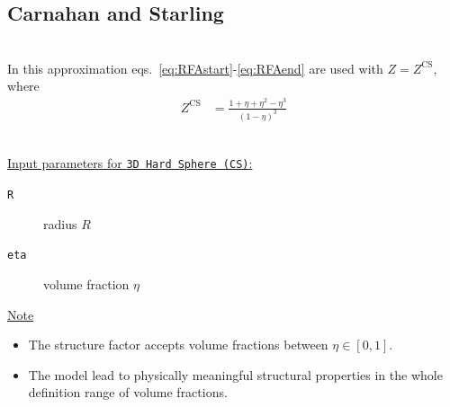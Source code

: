 \vspace{5mm}

\subsection{Carnahan and Starling} \cite{Carnahan1969} ~\\

\noindent In this approximation eqs.\ \ref{eq:RFAstart}-\ref{eq:RFAend} are used with $Z=Z^\mathrm{CS}$, where
\begin{align}
Z^\mathrm{CS} &= \frac{1+\eta+\eta^2-\eta^3}{\left(1-\eta\right)^3}
\end{align}

\vspace{5mm}

\hspace{1pt}\\
\underline{Input parameters for \texttt{3D Hard Sphere (CS)}:}
\begin{description}
    \item[\texttt{R}]  radius $R$
    \item[\texttt{eta}] volume fraction $\eta$
\end{description}

\noindent
\underline{Note}
\begin{itemize}
\item The structure factor accepts volume fractions between $\eta \in [0,1]$.
\item The model lead to physically meaningful structural properties in the whole definition range of volume fractions.
\end{itemize}

